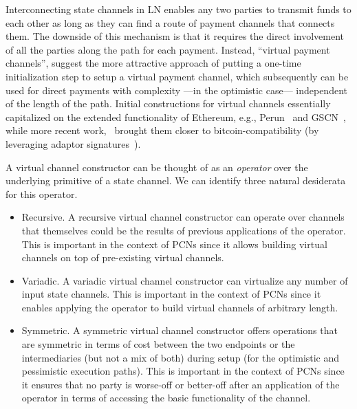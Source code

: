 Interconnecting state channels in LN enables any two parties to transmit funds to each other as long as they can find a route of payment channels that connects them. The downside of this mechanism is that it requires the direct involvement of all the parties along the path for each payment. Instead, ``virtual payment channels'', suggest the more attractive approach of putting a one-time initialization step to setup a virtual payment channel, which subsequently can be used for direct payments with complexity  ---in the optimistic case---  independent of the length of the path. 
Initial constructions for virtual channels essentially capitalized on the extended functionality of Ethereum, e.g., 
Perun~\cite{perun} and GSCN~\cite{DBLP:conf/ccs/DziembowskiFH18}, while more
recent work,~\cite{cryptoeprint:2020:554}  brought them closer to
bitcoin-compatibility (by leveraging adaptor
signatures~\cite{cryptoeprint:2020:476}).

A virtual channel constructor can be thought of as an  {\em operator} over the underlying primitive of a state channel. We can identify three   natural desiderata for this operator. 

\begin{itemize}
\item Recursive. A recursive virtual channel constructor can operate over channels that themselves could be the results of previous applications of the operator. This is important in the context of PCNs since it allows building virtual channels on top of pre-existing virtual channels.
\item Variadic. A variadic virtual channel constructor can virtualize any number of input state channels. This is important in the context of PCNs since it enables applying the operator to build virtual channels of arbitrary length.
\item Symmetric. A symmetric virtual channel constructor offers operations that are symmetric in terms of cost between the two endpoints or the intermediaries (but not a mix of both) during setup (for the optimistic and pessimistic execution paths). This is important in the context of PCNs since it ensures that no party is worse-off or better-off after an application of the operator in terms of accessing the basic functionality of the channel. 
\end{itemize}

